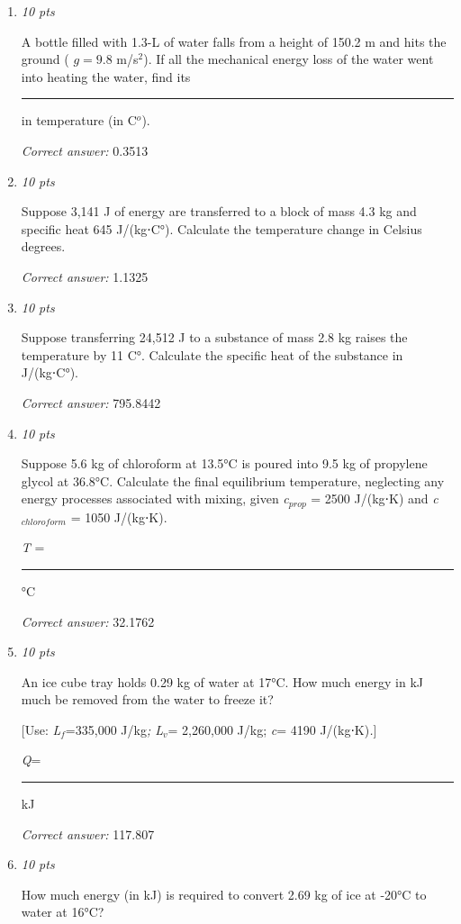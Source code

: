 \documentclass[11pt]{article}
\begin{document}
\begin{enumerate}[leftmargin=*,label=\textbf{Question \arabic*.}]
\item \hfill \textit{10 pts}

A bottle filled with 1.3-L of water falls from a height of 150.2 m and hits the ground ( $g=9.8$  m/s$^{2}$). If all the mechanical energy loss of the water went into heating the water, find its \rule{2.5cm}{0.4pt} in temperature (in C$^{o}$).

\textit{Correct answer:} 0.3513

\item \hfill \textit{10 pts}

Suppose 3,141 J of energy are transferred to a block of mass 4.3 kg and specific heat 645 J/(kg⋅C°). Calculate the temperature change in Celsius degrees.

\textit{Correct answer:} 1.1325

\item \hfill \textit{10 pts}

Suppose transferring 24,512 J to a substance of mass 2.8 kg raises the temperature by 11 C°. Calculate the specific heat of the substance in J/(kg⋅C°).

\textit{Correct answer:} 795.8442

\item \hfill \textit{10 pts}

Suppose 5.6 kg of chloroform  at 13.5°C is poured into 9.5 kg of propylene glycol at 36.8°C. Calculate the final equilibrium temperature, neglecting any energy processes associated with mixing, given \emph{c}$_{prop}$ = 2500 J/(kg⋅K) and \emph{c}$_{chloroform}$ = 1050 J/(kg⋅K).



\emph{T} = \rule{2.5cm}{0.4pt} °C

\textit{Correct answer:} 32.1762

\item \hfill \textit{10 pts}

An ice cube tray holds 0.29 kg of water at 17°C. How much energy in kJ much be removed from the water to freeze it?\emph{}

[Use: \emph{L}$_{f}$\emph{}=\emph{}335,000 J/kg\emph{; L}$_{v}$\emph{}= 2,260,000 J/kg; \emph{c}= 4190 J/(kg⋅K)\emph{.}]



\emph{Q}= \rule{2.5cm}{0.4pt} kJ

\textit{Correct answer:} 117.807

\item \hfill \textit{10 pts}

How much energy (in kJ) is required to convert 2.69 kg of ice at -20°C to water at 16°C?


\end{enumerate}
\end{document}
